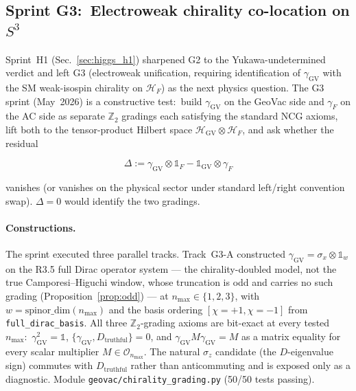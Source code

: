 \documentclass[11pt]{article}
\begin{document}
\subsection{Sprint G3:\ Electroweak chirality co-location on $S^3$}
\label{sec:g3}

Sprint~H1 (Sec.~\ref{sec:higgs_h1}) sharpened G2 to the
Yukawa-undetermined verdict and left G3 (electroweak unification,
requiring identification of $\gamma_{\mathrm{GV}}$ with the SM
weak-isospin chirality on $\mathcal{H}_F$) as the next physics
question.  The G3 sprint (May~2026) is a constructive test:\ build
$\gamma_{\mathrm{GV}}$ on the GeoVac side and $\gamma_F$ on the AC
side as separate $\mathbb{Z}_2$ gradings each satisfying the
standard NCG axioms, lift both to the tensor-product Hilbert space
$\mathcal{H}_{\mathrm{GV}} \otimes \mathcal{H}_F$, and ask whether
the residual

\begin{equation}
\Delta := \gamma_{\mathrm{GV}} \otimes \mathbb{1}_F -
          \mathbb{1}_{\mathrm{GV}} \otimes \gamma_F
\end{equation}

vanishes (or vanishes on the physical sector under standard
left/right convention swap).  $\Delta = 0$ would identify the two
gradings.

\paragraph{Constructions.}  The sprint executed three parallel
tracks.  Track~G3-A
constructed
$\gamma_{\mathrm{GV}} = \sigma_x \otimes \mathbb{1}_w$ on the
R3.5 full Dirac operator system --- the chirality-doubled model, not
the true Camporesi--Higuchi window, whose truncation is odd and carries
no such grading (Proposition~\ref{prop:odd}) --- at
$n_{\max} \in \{1, 2, 3\}$, with
$w = \mathrm{spinor\_dim}(n_{\max})$ and the basis ordering
$[\chi = +1, \chi = -1]$ from \texttt{full\_dirac\_basis}.  All three
$\mathbb{Z}_2$-grading axioms are bit-exact at every tested
$n_{\max}$:\ $\gamma_{\mathrm{GV}}^2 = \mathbb{1}$,
$\{\gamma_{\mathrm{GV}}, D_{\mathrm{truthful}}\} = 0$, and
$\gamma_{\mathrm{GV}} M \gamma_{\mathrm{GV}} = M$ as a matrix
equality for every scalar multiplier $M \in \mathcal{O}_{n_{\max}}$.
The natural $\sigma_z$ candidate (the $D$-eigenvalue sign) commutes
with $D_{\mathrm{truthful}}$ rather than anticommuting and is exposed
only as a diagnostic.  Module
\texttt{geovac/chirality\_grading.py} (50/50 tests passing).
\end{document}
